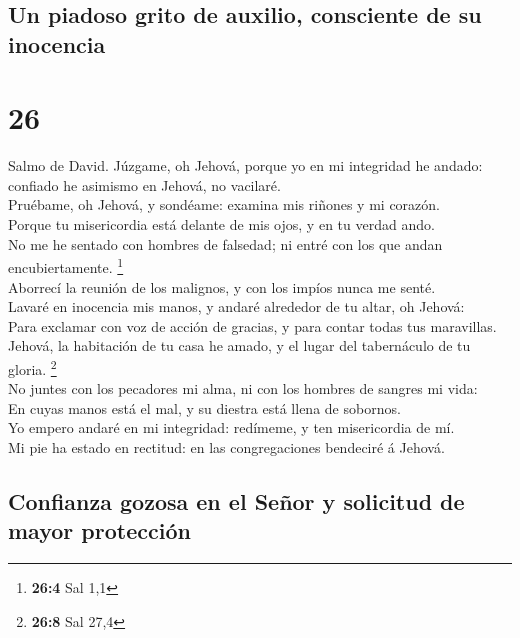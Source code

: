 \hypertarget{un-piadoso-grito-de-auxilio-consciente-de-su-inocencia}{%
\subsection{Un piadoso grito de auxilio, consciente de su
inocencia}\label{un-piadoso-grito-de-auxilio-consciente-de-su-inocencia}}

\hypertarget{section-25}{%
\section{26}\label{section-25}}

 Salmo de David. Júzgame, oh Jehová, porque yo en mi
integridad he andado: confiado he asimismo en Jehová, no vacilaré.\\
 Pruébame, oh Jehová, y sondéame: examina mis riñones y mi
corazón.\\
 Porque tu misericordia está delante de mis ojos, y en tu
verdad ando.\\
 No me he sentado con hombres de falsedad; ni entré con los
que andan encubiertamente. \footnote{\textbf{26:4} Sal 1,1}\\
 Aborrecí la reunión de los malignos, y con los impíos nunca
me senté.\\
 Lavaré en inocencia mis manos, y andaré alrededor de tu
altar, oh Jehová:\\
 Para exclamar con voz de acción de gracias, y para contar
todas tus maravillas.\\
 Jehová, la habitación de tu casa he amado, y el lugar del
tabernáculo de tu gloria. \footnote{\textbf{26:8} Sal 27,4}\\
 No juntes con los pecadores mi alma, ni con los hombres de
sangres mi vida:\\
 En cuyas manos está el mal, y su diestra está llena de
sobornos.\\
 Yo empero andaré en mi integridad: redímeme, y ten
misericordia de mí.\\
 Mi pie ha estado en rectitud: en las congregaciones
bendeciré á Jehová.

\hypertarget{confianza-gozosa-en-el-seuxf1or-y-solicitud-de-mayor-protecciuxf3n}{%
\subsection{Confianza gozosa en el Señor y solicitud de mayor
protección}\label{confianza-gozosa-en-el-seuxf1or-y-solicitud-de-mayor-protecciuxf3n}}


